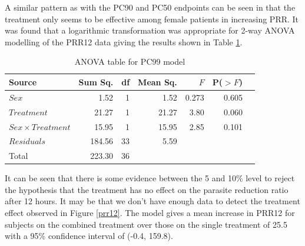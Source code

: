 A similar pattern as with the PC90 and PC50 endpoints can be seen in that the treatment only seems to be effective among female patients in increasing PRR. It was found that a logarithmic transformation was appropriate for 2-way ANOVA modelling of the PRR12 data giving the results shown in Table \ref{aovprr12}.
\begin{table}[h]
\centering
\caption{ANOVA table for PC99 model}\label{aovprr12}
\begin{tabular}{l|rrrrrl}
Source&Sum Sq.&df&Mean Sq.&$F$&P($>F$)\\
\hline
$Sex$				& 1.52 & 1 & 1.52 & 0.273 & 0.605 & \\
$Treatment$			& 21.27   & 1 & 21.27   & 3.80 & 0.060 & \\
$Sex\times Treatment$	& 15.95   & 1 & 15.95   & 2.85   & 0.101 & \\
$Residuals$			& 184.56 & 33 & 5.59 &&&\\
\hline
Total&223.30&36&&&
\end{tabular}
\end{table}

It can be seen that there is some evidence between the 5 and 10\% level to reject the hypothesis that the treatment has no effect on the parasite reduction ratio after 12 hours. It may be that we don't have enough data to detect the treatment effect observed in Figure \ref{prr12}. The model gives a mean increase in PRR12 for subjects on the combined treatment over those on the single treatment of 25.5 with a 95\% confidence interval of (-0.4, 159.8).


